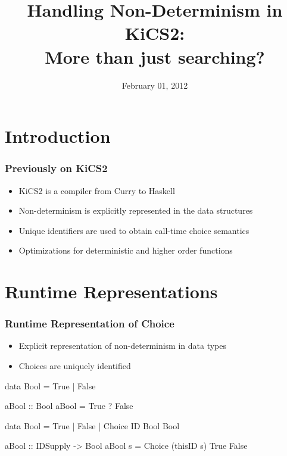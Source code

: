 \documentclass[
,hyperref={pdfpagelabels=false}
]{beamer}
\title[Handling Non-Determinism in KiCS2]{%
Handling Non-Determinism in KiCS2: \\ More than just searching?
}
\date{February 01, 2012}
\author[Braßel, Hanus, \underline{Peemöller}, Reck]{%
\texorpdfstring
  {Bernd Braßel \and Michael Hanus \\
   \underline{Björn Peemöller} \and Fabian Reck}
  {Bernd Braßel \and Michael Hanus \and Björn Peemöller \and Fabian Reck}
}
\institute{Kiel University}
\begin{document}
\begin{frame}%
\titlepage
\end{frame}


\section{Introduction}

\begin{frame}[fragile]
\frametitle{Previously on KiCS2}
\begin{itemize}
\item KiCS2 is a compiler from Curry to Haskell
\item Non-determinism is explicitly represented in
      the data structures
\item Unique identifiers are used to obtain
      call-time choice semantics
\item Optimizations for deterministic and higher order functions
\end{itemize}
\end{frame}


\section{Runtime Representations}

\begin{frame}[fragile]%
\frametitle{Runtime Representation of Choice}
\begin{itemize}
  \item Explicit representation of non-determinism in data types
  \item Choices are uniquely identified
\end{itemize}

\begin{curry}
data Bool = True | False

aBool :: Bool
aBool = True ? False
\end{curry}

\begin{haskell}
data Bool = True | False | Choice ID Bool Bool

aBool :: IDSupply -> Bool
aBool s = Choice (thisID s) True False
\end{haskell}
\end{frame}
\end{document}
